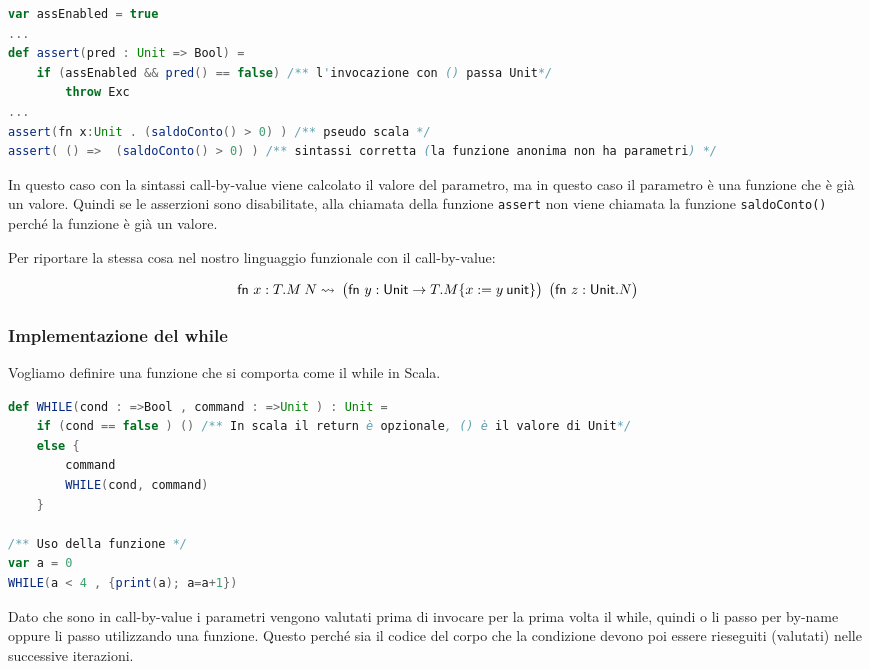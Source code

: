 \begin{lstlisting}[language=Scala, caption=Version ``standard'' delle asserzioni]
var assEnabled = true
...
def assert(pred : Unit => Bool) = 
	if (assEnabled && pred() == false) /** l'invocazione con () passa Unit*/
		throw Exc
...
assert(fn x:Unit . (saldoConto() > 0) ) /** pseudo scala */
assert( () =>  (saldoConto() > 0) ) /** sintassi corretta (la funzione anonima non ha parametri) */
\end{lstlisting}

\noindent In questo caso con la sintassi call-by-value viene calcolato il valore del parametro, ma in questo caso il parametro è una funzione che è già un valore.
Quindi se le asserzioni sono disabilitate, alla chiamata della funzione \texttt{assert} non viene chiamata la funzione \texttt{saldoConto()} perché la funzione è già un valore.

Per riportare la stessa cosa nel nostro linguaggio funzionale con il call-by-value:

$$
\fn x:T.M \: N \rightsquigarrow \: \big(\fn y : \text{Unit} \rightarrow T . M\{x := y \: \text{unit}\} \big) \:\:  \big(\fn z : \text{Unit} . N \big)
$$

\subsubsection{Implementazione del while}

Vogliamo definire una funzione che si comporta come il while in Scala.

\begin{lstlisting}[language=Scala, caption=I parametri devono essere dichiarati come call-by-name oppure  ]
def WHILE(cond : =>Bool , command : =>Unit ) : Unit = 
	if (cond == false ) () /** In scala il return è opzionale, () è il valore di Unit*/
	else {
		command
		WHILE(cond, command)
	}

/** Uso della funzione */
var a = 0
WHILE(a < 4 , {print(a); a=a+1})
\end{lstlisting}

\noindent Dato che sono in call-by-value i parametri vengono valutati prima di invocare per la prima volta il while, quindi o li passo per by-name oppure li passo utilizzando una funzione. 
Questo perché sia il codice del corpo che la condizione devono poi essere rieseguiti (valutati) nelle successive iterazioni. 


